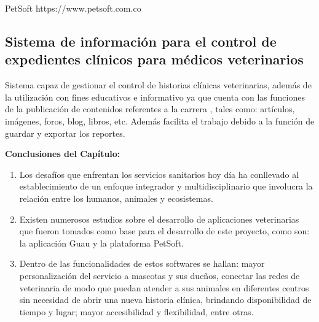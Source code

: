 PetSoft
https://www.petsoft.com.co

\subsection{Sistema de información para el control de expedientes clínicos para médicos veterinarios}

Sistema capaz de gestionar el control de historias 
clínicas veterinarias, además de la utilización con fines educativos e informativo ya que 
cuenta con las funciones de la publicación de contenidos referentes a la carrera , tales 
como: artículos, imágenes, foros, blog, libros, etc. Además facilita el trabajo debido a la 
función de guardar y exportar los reportes.
\newline


\textbf{{\large Conclusiones del Capítulo:}}
\begin{enumerate}
	\item Los desafíos que enfrentan los servicios sanitarios hoy día ha 
	conllevado al establecimiento de un enfoque integrador y 
	multidisciplinario que involucra la relación entre los humanos, 
	animales y ecosistemas.
	\item Existen numerosos estudios sobre el desarrollo de aplicaciones 
	veterinarias que fueron tomados como base para el desarrollo de este 
	proyecto, como son: la aplicación Guau y la plataforma PetSoft.
	\item Dentro de las funcionalidades de estos softwares se hallan: mayor 
	personalización del servicio a mascotas y sus dueños, conectar las 
	redes de veterinaria de modo que puedan atender a sus animales en 
	diferentes centros sin necesidad de abrir una nueva historia clínica, 
	brindando disponibilidad de tiempo y lugar; mayor accesibilidad y 
	flexibilidad, entre otras.
\end{enumerate}



